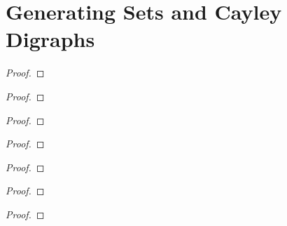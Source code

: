 \section{Generating Sets and Cayley Digraphs}

\begin{exercise}
\end{exercise}

\begin{proof}
\end{proof}

\begin{exercise}
\end{exercise}

\begin{proof}
\end{proof}

\begin{exercise}
\end{exercise}

\begin{proof}
\end{proof}

\begin{exercise}
\end{exercise}

\begin{proof}
\end{proof}

\begin{exercise}
\end{exercise}

\begin{proof}
\end{proof}

\begin{exercise}
\end{exercise}

\begin{proof}
\end{proof}

\begin{exercise}
\end{exercise}

\begin{proof}
\end{proof}

\begin{exercise}
\end{exercise}

